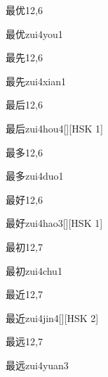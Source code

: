 \begin{entry}{最优}{12,6}
  \begin{phonetics}{最优}{zui4you1}
  \end{phonetics}
\end{entry}

\begin{entry}{最先}{12,6}
  \begin{phonetics}{最先}{zui4xian1}
  \end{phonetics}
\end{entry}

\begin{entry}{最后}{12,6}
  \begin{phonetics}{最后}{zui4hou4}[][HSK 1]
  \end{phonetics}
\end{entry}

\begin{entry}{最多}{12,6}
  \begin{phonetics}{最多}{zui4duo1}
  \end{phonetics}
\end{entry}

\begin{entry}{最好}{12,6}
  \begin{phonetics}{最好}{zui4hao3}[][HSK 1]
  \end{phonetics}
\end{entry}

\begin{entry}{最初}{12,7}
  \begin{phonetics}{最初}{zui4chu1}
  \end{phonetics}
\end{entry}

\begin{entry}{最近}{12,7}
  \begin{phonetics}{最近}{zui4jin4}[][HSK 2]
  \end{phonetics}
\end{entry}

\begin{entry}{最远}{12,7}
  \begin{phonetics}{最远}{zui4yuan3}
  \end{phonetics}
\end{entry}

